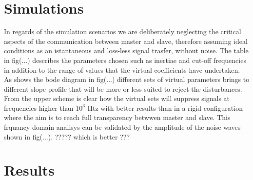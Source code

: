 \section{Simulations}
In regards of the simulation scenarios we are deliberately neglecting the
critical aspects of the communication between master and slave, therefore
assuming ideal conditions as an istantaneous and loss-less signal trasfer,
without noise.
The table in fig(...) describes the parameters chosen such as inertiae and
cut-off frequencies in addition to the range of values that the virtual
coefficients have undertaken.
As shows the bode diagram in fig(...) different sets of virtual parameters
brings to different slope profile that will be more or less suited to reject the
disturbances.
From the upper scheme is clear how the virtual sets will suppress signals at
frequencies higher than $10^3$ Htz with better results than in a rigid
configuration where the aim is to reach full transparency betwwen master and
slave.
This frquancy domain analisys can be validated by the amplitude of the noise
waves shown in fig(...).
????? which is better ???



\section{Results}